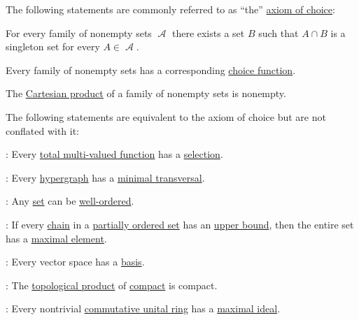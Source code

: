 \begin{theorem}\label{thm:axiom_of_choice_equivalences}
  The following statements are commonly referred to as \enquote{the} \hyperref[def:zfc/choice]{axiom of choice}:
  \begin{thmenum}[series=thm:axiom_of_choice_equivalences]
     For every family of nonempty sets \( \mscrA \) there exists a set \( B \) such that \( A \cap B \) is a singleton set for every \( A \in \mscrA \).

     Every family of nonempty sets has a corresponding \hyperref[def:choice_function]{choice function}.

     The \hyperref[def:cartesian_product]{Cartesian product} of a family of nonempty sets is nonempty.
  \end{thmenum}

  The following statements are equivalent to the axiom of choice but are not conflated with it:
  \begin{thmenum}[resume=thm:axiom_of_choice_equivalences]
     : Every \hyperref[def:multi_valued_function/total]{total multi-valued function} has a \hyperref[def:function/selection]{selection}.

     : Every \hyperref[def:hypergraph]{hypergraph} has a \hyperref[def:minimal_hypergraph_transversal]{minimal transversal}.

     : Any \hyperref[def:set]{set} can be \hyperref[def:well_ordered_set]{well-ordered}.

     : If every \hyperref[def:partially_ordered_set_chain_and_antichain]{chain} in a \hyperref[def:partially_ordered_set]{partially ordered set} has an \hyperref[def:partially_ordered_set_extremal_points/upper_and_lower_bounds]{upper bound}, then the entire set has a \hyperref[def:partially_ordered_set_extremal_points/maximal_and_minimal_element]{maximal element}.

     : Every vector space has a \hyperref[def:left_module_hamel_basis]{basis}.

     : The \hyperref[def:topological_product]{topological product} of \hyperref[def:compact_space]{compact} is compact.

     : Every nontrivial \hyperref[def:semiring/commutative_unital_ring]{commutative unital ring} has a \hyperref[def:maximal_ring_ideal]{maximal ideal}.
  \end{thmenum}
\end{theorem}
